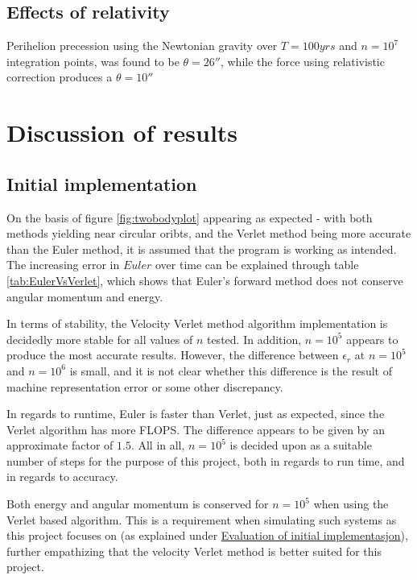 \documentclass[%
oneside,                 %
final,                   %
10pt]{article}
\begin{document}
\subsection{Effects of relativity}
Perihelion precession using the Newtonian gravity over $T=100yrs$ and $n=10^7$ integration points, was found to be $\theta=26''$, while the force using relativistic correction produces a $\theta=10''$

\section{Discussion of results}
\subsection{Initial implementation}
\label{subsec:Discofres:initimpl}

On the basis of figure \ref{fig:twobodyplot} appearing as expected - with both methods yielding near circular oribts, and the Verlet method being more accurate than the Euler method, it is assumed that the program is working as intended. The increasing error in $Euler$ over time can be explained through table \ref{tab:EulerVsVerlet}, which shows that Euler's forward method does not conserve angular momentum and energy. \newline

In terms of stability, the Velocity Verlet method algorithm implementation is decidedly more stable for all values of $n$ tested. In addition, $n=10^5$ appears to produce the most accurate results. However, the difference between $\epsilon_r$ at $n=10^5$ and $n=10^6$ is small, and it is not clear whether this difference is the result of machine representation error or some other discrepancy.\newline

In regards to runtime, Euler is faster than Verlet, just as expected, since the Verlet algorithm has more FLOPS. The difference appears to be given by an approximate factor of $1.5$. All in all, $n=10^5$ is decided upon as a suitable number of steps for the purpose of this project, both in regards to run time, and in regards to accuracy.\newline

Both energy and angular momentum is conserved for $n=10^5$ when using the Verlet based algorithm. This is a requirement when simulating such systems as this project focuses on (as explained under \hyperref[subsec:ev_of_init_impl]{Evaluation of initial implementasjon}), further empathizing that the velocity Verlet method is better suited for this project. \newline
\end{document}
